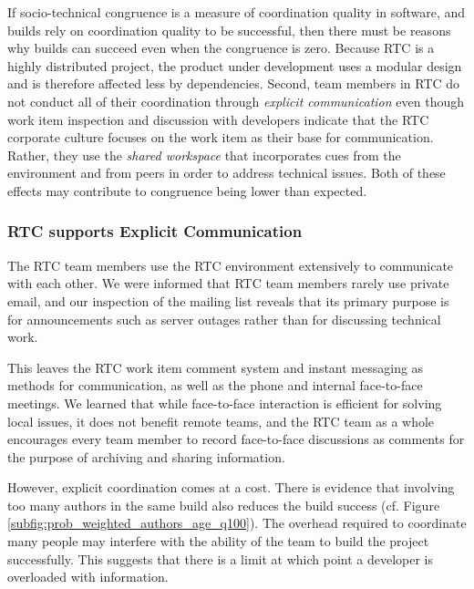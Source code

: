 If socio-technical congruence is a measure of coordination quality in software, and builds rely on coordination quality to be successful, then there must be reasons why builds can succeed even when the congruence is zero.
Because RTC is a highly distributed project, the product under development uses a modular design \cite{maccormack2006} and is therefore affected less by dependencies. Second, team members in RTC do not conduct all of their coordination through \emph{explicit communication} even though work item inspection and discussion with developers indicate that the RTC corporate culture focuses on the work item as their base for communication. Rather, they use the \emph{shared workspace} that incorporates cues from the environment and from peers in order to address technical issues. Both of these effects may contribute to congruence being lower than expected.

\subsubsection{RTC supports Explicit Communication}
The RTC team members use the RTC environment extensively to communicate with each other. We were informed that RTC team members rarely use private email, and our inspection of the mailing list reveals that its primary purpose is for announcements such as server outages rather than for discussing technical work.

This leaves the RTC work item comment system and instant messaging as methods for communication, as well as the phone and internal face-to-face meetings.
We learned that while face-to-face interaction is efficient for solving local issues, it does not benefit remote teams, and the RTC team as a whole encourages every team member to record face-to-face discussions as comments for the purpose of archiving and sharing information.

However, explicit coordination comes at a cost. There is evidence that involving too many authors in the same build also reduces the build success (cf. Figure \ref{subfig:prob_weighted_authors_age_q100}). The overhead required to coordinate many people may interfere with the ability of the team to build the project successfully. This suggests that there is a limit at which point a developer is overloaded with information.

